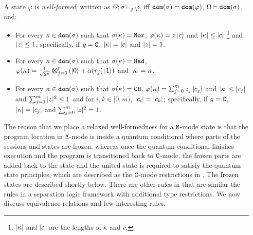 \begin{definition}\label{def:well-formed}\rm 
  A state $\varphi$ is \emph{well-formed}, written as
  $\Omega;\sigma \vdash_g \varphi$, iff $\mathtt{dom}(\sigma) = \mathtt{dom}(\varphi)$, $\Omega\vdash\mathtt{dom}(\sigma)$, and:
\begin{itemize}
\item For every $\kappa \in \mathtt{dom}(\sigma)$ such that $\sigma(\kappa) = \texttt{Nor}$, $\varphi(\kappa)=z\left\vert{c}\right\rangle$ and $|\kappa|\le |c|$ \footnote{$|\kappa|$ and $|c|$ are the lengths of $\kappa$ and $c$. } and $|z|\le 1$; specifically, if $g=\texttt{C}$,  $|\kappa| = |c|$ and $|z| = 1$.

\item For every $\kappa \in \mathtt{dom}(\sigma)$ such that $\sigma(\kappa) = \texttt{Had}$, $\varphi(\kappa)=\shad{2^n}{n}{\alpha(r_j)}$ and $|\kappa|=n$.

\item For every $\kappa \in \mathtt{dom}(\sigma)$ such that $\sigma(\kappa) = \texttt{CH}$, $\varphi(\kappa)=\sch{m}{z_j}{c_j}$ and $|\kappa|\le |c_j|$ and $\sum_{j=0}^m|z|^2\le 1$ and for $i,k\in [0,m)$, $|c_i|=|c_k|$;  specifically, if $g=\texttt{C}$,  $|\kappa| = |c_j|$ and $\sum_{j=0}^m|z|^2 = 1$.
\end{itemize}
\end{definition}

The reason that we place a relaxed well-formedness for a $\texttt{M}$-mode state is that the program location in $\texttt{M}$-mode is inside a quantum conditional where parts of the sessions and states are frozen, whereas once the quantum conditional finishes execution and the program is transitioned back to $\texttt{C}$-mode, the frozen parts are added back to the state and the united state is required to satisfy the quantum state principles, which are described as the $\texttt{C}$-mode restrictions in . The frozen states are described shortly below.
There are other rules in  that are similar the rules in a separation logic framework with additional \qafny type restrictions. We now discuss \qafny equivalence relations and few interesting rules.

